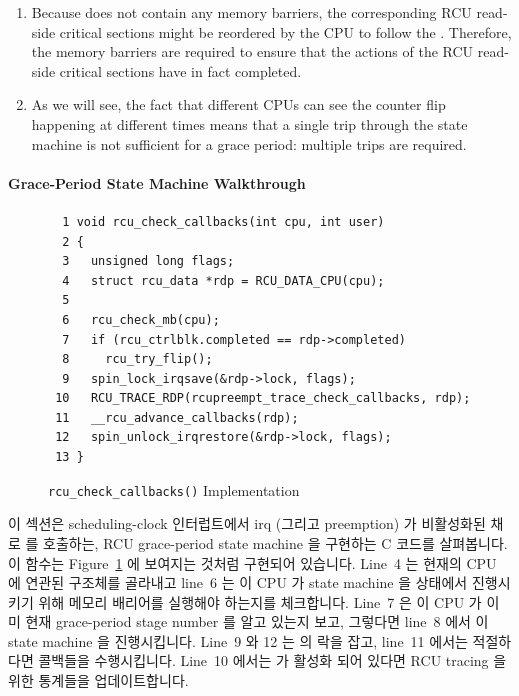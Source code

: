 \begin{enumerate}
\item	Because  does not contain any
	memory barriers, the corresponding RCU read-side critical
	sections might be reordered by the CPU to follow the
	.
	Therefore, the memory barriers are required to ensure
	that the actions of the RCU read-side critical sections
	have in fact completed.
\item	As we will see, the fact that different CPUs can see the
	counter flip happening at different times means that a
	single trip through the state machine is not sufficient
	for a grace period: multiple trips are required.
\fi
\end{enumerate}

\paragraph{Grace-Period State Machine Walkthrough}
\label{app:rcuimpl:Grace-Period State Machine Walkthrough}

\begin{figure}[tbp]
{ \scriptsize
\begin{verbatim}
  1 void rcu_check_callbacks(int cpu, int user)
  2 {
  3   unsigned long flags;
  4   struct rcu_data *rdp = RCU_DATA_CPU(cpu);
  5
  6   rcu_check_mb(cpu);
  7   if (rcu_ctrlblk.completed == rdp->completed)
  8     rcu_try_flip();
  9   spin_lock_irqsave(&rdp->lock, flags);
 10   RCU_TRACE_RDP(rcupreempt_trace_check_callbacks, rdp);
 11   __rcu_advance_callbacks(rdp);
 12   spin_unlock_irqrestore(&rdp->lock, flags);
 13 }
\end{verbatim}
}
\caption{{\tt rcu\_check\_callbacks()} Implementation}
\label{fig:app:rcuimpl:rcu_check_callbacks() Implementation}
\end{figure}

이 섹션은 scheduling-clock 인터럽트에서 irq (그리고 preemption) 가 비활성화된
채로  를 호출하는, RCU grace-period state machine 을
구현하는 C 코드를 살펴봅니다.
이 함수는
Figure~\ref{fig:app:rcuimpl:rcu_check_callbacks() Implementation}
에 보여지는 것처럼 구현되어 있습니다.
Line~4 는 현재의 CPU 에 연관된  구조체를 골라내고 line~6 는 이 CPU
가 state machine 을  상태에서 진행시키기 위해
메모리 배리어를 실행해야 하는지를 체크합니다.
Line~7 은 이 CPU 가 이미 현재 grace-period stage number 를 알고 있는지 보고,
그렇다면 line~8 에서 이 state machine 을 진행시킵니다.
Line~9 와 12 는  의 락을 잡고, line~11 에서는 적절하다면 콜백들을
수행시킵니다.
Line~10 에서는  가 활성화 되어 있다면 RCU tracing 을 위한
통계들을 업데이트합니다.
\iffalse

